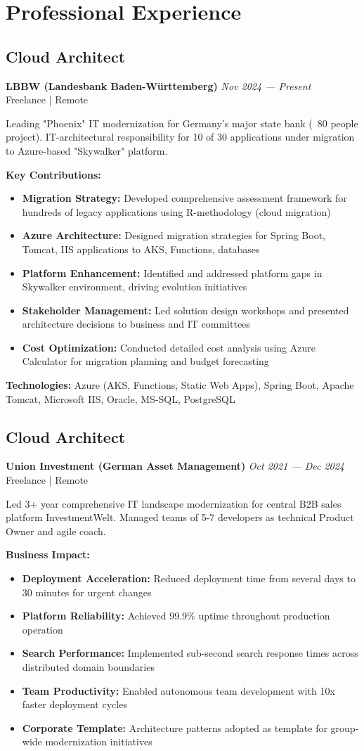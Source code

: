 \documentclass[10pt,a4paper]{article}
\newcommand{\role}[4]{\subsection{#1}\textbf{#2} \hfill \textit{#3}\\#4\vspace{2mm}}
\newcommand{\achievement}[1]{\item \textbf{#1}}
\begin{document}
\vspace{3mm}

\section{Professional Experience}

\role{Cloud Architect}{LBBW (Landesbank Baden-Württemberg)}{Nov 2024 — Present}{Freelance | Remote}

Leading "Phoenix" IT modernization for Germany's major state bank (~80 people project). IT-architectural responsibility for 10 of 30 applications under migration to Azure-based "Skywalker" platform.

\textbf{Key Contributions:}
\begin{itemize}
\achievement{Migration Strategy:} Developed comprehensive assessment framework for hundreds of legacy applications using R-methodology (cloud migration)
\achievement{Azure Architecture:} Designed migration strategies for Spring Boot, Tomcat, IIS applications to AKS, Functions, databases
\achievement{Platform Enhancement:} Identified and addressed platform gaps in Skywalker environment, driving evolution initiatives
\achievement{Stakeholder Management:} Led solution design workshops and presented architecture decisions to business and IT committees
\achievement{Cost Optimization:} Conducted detailed cost analysis using Azure Calculator for migration planning and budget forecasting
\end{itemize}

\textbf{Technologies:} Azure (AKS, Functions, Static Web Apps), Spring Boot, Apache Tomcat, Microsoft IIS, Oracle, MS-SQL, PostgreSQL

\role{Cloud Architect}{Union Investment (German Asset Management)}{Oct 2021 — Dec 2024}{Freelance | Remote}

Led 3+ year comprehensive IT landscape modernization for central B2B sales platform InvestmentWelt. Managed teams of 5-7 developers as technical Product Owner and agile coach.

\textbf{Business Impact:}
\begin{itemize}
\achievement{Deployment Acceleration:} Reduced deployment time from several days to 30 minutes for urgent changes
\achievement{Platform Reliability:} Achieved 99.9\% uptime throughout production operation
\achievement{Search Performance:} Implemented sub-second search response times across distributed domain boundaries
\achievement{Team Productivity:} Enabled autonomous team development with 10x faster deployment cycles
\achievement{Corporate Template:} Architecture patterns adopted as template for group-wide modernization initiatives
\end{itemize}
\end{document}
